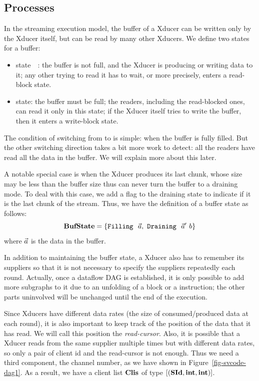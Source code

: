 \subsection{Processes}
In the streaming execution model, the buffer of a Xducer can be written only by the Xducer itself, but can be read by many other Xducers. 
We define two states for a buffer:
\begin{itemize}
	\item \filling state　: the buffer is not full, and the Xducer is producing or writing data to it; any other trying to read it has to wait, or more precisely, enters a read-block state.

	\item \draining state: the buffer must be full; the readers, including the read-blocked ones, can read it only in this state; if the Xducer itself tries to write the buffer, then it enters a write-block state.
\end{itemize}

The condition of switching from \filling to \draining is simple: when the buffer is fully filled. 
But the other switching direction takes a bit more work to detect: all the readers have read all the data in the buffer. We will explain more about this later.


A notable special case is when the Xducer produces its last chunk, whose size may be less than the buffer size thus can never turn the buffer to a draining mode.
To deal with this case, we add a flag to the draining state to indicate if it is the last chunk of the stream. 
Thus, we have the definition of a buffer state as follows:
$$\mathbf{BufState} = \{\texttt{Filling} \  \ \vec a, \ \texttt{Draining} \  \ \vec a' \ b \} $$
where $\vec a$ is the data in the buffer.

In addition to maintaining the buffer state, a Xducer also has to remember its suppliers so that it is not necessary to specify the suppliers repeatedly each round. 
Actually, once a dataflow DAG is established, it is only possible to add more subgraphs to it due to an unfolding of a \wc block or a \sc instruction; the other parts uninvolved will be unchanged until the end of the execution.


Since Xducers have different data rates (the size of consumed/produced data at each round), it is also important to keep track of the position of the data that it has read.
We will call this position the \emph{read-cursor}.
Also, it is possible that a Xducer reads from the same supplier multiple times but with different data rates, so only a pair of client id and the read-cursor is not enough.
Thus we need a third component, the channel number, as we have shown in Figure~\ref{fig-svcode-dag1}.
As a result, we have a client list $\mathbf{Clis}$ of type $[(\mathbf{SId}, \mathbf{int}, \mathbf{int})]$.

